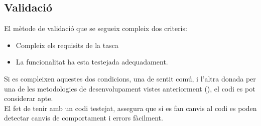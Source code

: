 \subsection{Validació}
\label{metodologia:validacio}
El mètode de validació que se segueix compleix dos criteris:
\begin{itemize}
    \item Compleix els requisits de la tasca
    \item La funcionalitat ha esta testejada adequadament.
\end{itemize}
Si es compleixen aquestes dos condicions, una de sentit comú, i l'altra donada per una de les metodologies de desenvolupament vistes anteriorment (), el codi es pot considerar apte.\\
El fet de tenir amb un codi testejat, assegura que si es fan canvis al codi es poden detectar canvis de comportament i errors fàcilment.

